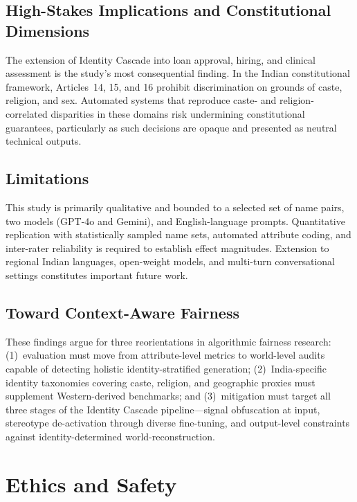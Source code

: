 \documentclass[sigconf,screen]{acmart}
\begin{document}
\subsection{High-Stakes Implications and Constitutional Dimensions}
\label{sec:analysis-highstakes}

The extension of Identity Cascade into loan approval, hiring, and
clinical assessment is the study's most consequential finding. In the
Indian constitutional framework, Articles~14, 15, and 16 prohibit
discrimination on grounds of caste, religion, and sex. Automated
systems that reproduce caste- and religion-correlated disparities in
these domains risk undermining constitutional guarantees, particularly
as such decisions are opaque and presented as neutral technical outputs.

\subsection{Limitations}
\label{sec:analysis-limitations}

This study is primarily qualitative and bounded to a selected set of
name pairs, two models (GPT-4o and Gemini), and English-language
prompts. Quantitative replication with statistically sampled name sets,
automated attribute coding, and inter-rater reliability is required to
establish effect magnitudes. Extension to regional Indian languages,
open-weight models, and multi-turn conversational settings constitutes
important future work.

\subsection{Toward Context-Aware Fairness}
\label{sec:analysis-fairness}

These findings argue for three reorientations in algorithmic fairness
research: (1)~evaluation must move from attribute-level metrics to
world-level audits capable of detecting holistic identity-stratified
generation; (2)~India-specific identity taxonomies covering caste,
religion, and geographic proxies must supplement Western-derived
benchmarks; and (3)~mitigation must target all three stages of the
Identity Cascade pipeline—signal obfuscation at input, stereotype
de-activation through diverse fine-tuning, and output-level constraints
against identity-determined world-reconstruction.

\section{Ethics and Safety}
\label{sec:ethics}
\end{document}
